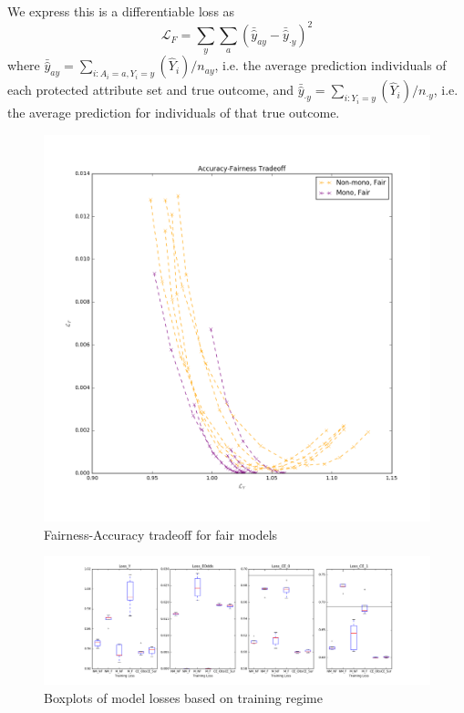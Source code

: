         We express this is a differentiable loss as 
        $$
            \mathcal{L}_F = \sum\limits_{y} \sum\limits_{a} \left( \bar{\hat{y}}_{ay} - \bar{\hat{y}}_{\cdot y} \right)^2
        $$
        where $\bar{\hat{y}}_{ay} = \sum_{i: A_i = a, Y_i = y}(\hat{Y}_i) / n_{ay}$, i.e. the average prediction individuals of each protected attribute set and true outcome, and $\bar{\hat{y}}_{\cdot y} = \sum_{i: Y_i = y}(\hat{Y}_i) / n_{\cdot y}$, i.e. the average prediction for individuals of that true outcome.
        
        \begin{figure}
            \centering
            \includegraphics[width=\textwidth]{fig_softmono/compas_tradeoffs_fair.png}
            \caption{Fairness-Accuracy tradeoff for fair models}
            \label{fig:sm_compas_tradeoffs}
        \end{figure}
        
        \begin{figure}
            \centering
            \includegraphics[width=\textwidth]{fig_softmono/compas_boxplot.png}
            \caption{Boxplots of model losses based on training regime}
            \label{fig:sm_compas_boxplots}
        \end{figure}
        
